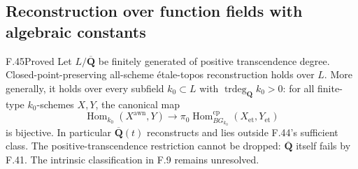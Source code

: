 \subsection{Reconstruction over function fields with algebraic constants}

\begin{claim}{F.45}{Proved}\label{clm:F45}
Let $L/\overline{\mathbf Q}$ be finitely generated of positive
transcendence degree. Closed-point-preserving all-scheme \'etale-topos
reconstruction holds over $L$. More generally, it holds over every
subfield $k_0\subset L$ with $\operatorname{trdeg}_{\mathbf Q}k_0>0$:
for all finite-type $k_0$-schemes $X,Y$, the canonical map
\[
 \operatorname{Hom}_{k_0}(X^{\mathrm{awn}},Y)
 \longrightarrow
 \pi_0\operatorname{Hom}^{\mathrm{cp}}_{BG_{k_0}}
       (X_{\mathrm{et}},Y_{\mathrm{et}})
\]
is bijective.
In particular $\overline{\mathbf Q}(t)$ reconstructs and lies outside
F.44's sufficient class. The positive-transcendence restriction cannot
be dropped: $\overline{\mathbf Q}$ itself fails by F.41.
The intrinsic classification in F.9 remains unresolved.
\end{claim}
